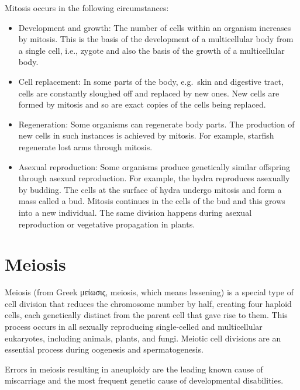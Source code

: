 Mitosis occurs in the following circumstances:

\begin{itemize}
\tightlist
\item
  Development and growth: The number of cells within an organism increases by mitosis. This is the basis of the development of a multicellular body from a single cell, i.e., zygote and also the basis of the growth of a multicellular body.
\item
  Cell replacement: In some parts of the body, e.g.~skin and digestive tract, cells are constantly sloughed off and replaced by new ones. New cells are formed by mitosis and so are exact copies of the cells being replaced.
\item
  Regeneration: Some organisms can regenerate body parts. The production of new cells in such instances is achieved by mitosis. For example, starfish regenerate lost arms through mitosis.
\item
  Asexual reproduction: Some organisms produce genetically similar offspring through asexual reproduction. For example, the hydra reproduces asexually by budding. The cells at the surface of hydra undergo mitosis and form a mass called a bud. Mitosis continues in the cells of the bud and this grows into a new individual. The same division happens during asexual reproduction or vegetative propagation in plants.
\end{itemize}

\hypertarget{meiosis}{%
\section{Meiosis}\label{meiosis}}

Meiosis (from Greek μείωσις, meiosis, which means lessening) is a special type of cell division that reduces the chromosome number by half, creating four haploid cells, each genetically distinct from the parent cell that gave rise to them. This process occurs in all sexually reproducing single-celled and multicellular eukaryotes, including animals, plants, and fungi. Meiotic cell divisions are an essential process during oogenesis and spermatogenesis.

Errors in meiosis resulting in aneuploidy are the leading known cause of miscarriage and the most frequent genetic cause of developmental disabilities.

